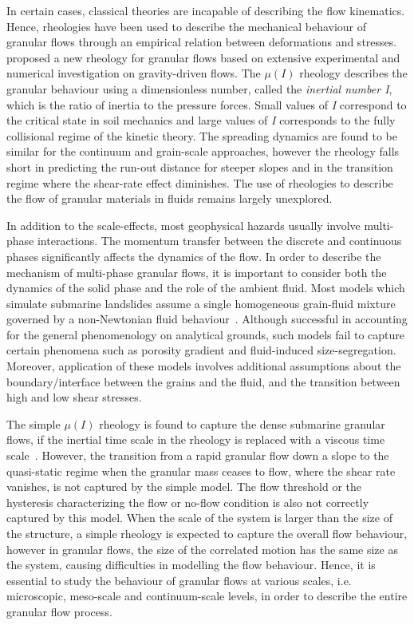In certain cases, classical theories are incapable of describing the flow 
kinematics. Hence, rheologies have been used to describe the mechanical 
behaviour of granular flows through an empirical relation between deformations 
and stresses.~\citet{Midi2004} proposed a new rheology for granular flows based 
on extensive experimental and numerical investigation on gravity-driven flows. 
The $\mu(I)$ rheology describes the granular behaviour using a dimensionless 
number, called the \textit{inertial number I}, which is the ratio of inertia to 
the pressure forces. Small values of \textit{I} correspond to the critical 
state in soil mechanics and large values of \textit{I} corresponds to the fully 
collisional regime of the kinetic theory. The spreading dynamics are found to 
be similar for the continuum and grain-scale approaches, however the rheology 
falls short in predicting the run-out distance for steeper slopes and in the 
transition regime where the shear-rate effect diminishes. The use of rheologies 
to describe the flow of granular materials in fluids remains largely 
unexplored.


In addition to the scale-effects, most geophysical hazards usually involve 
multi-phase interactions. The momentum transfer between the discrete and 
continuous phases significantly affects the dynamics of the flow. In order to 
describe the mechanism of multi-phase granular flows, it is important to 
consider both the dynamics of the solid phase and the role of the ambient 
fluid. Most models which simulate submarine landslides assume a single 
homogeneous grain-fluid mixture governed by a non-Newtonian fluid 
behaviour~\citep{Denlinger2001,Iverson2000}. Although successful in accounting 
for the general phenomenology on analytical grounds, such models fail to 
capture certain phenomena such as porosity gradient and fluid-induced 
size-segregation. Moreover, application of these models involves additional 
assumptions about the boundary/interface between the grains and the fluid, and 
the transition between high and low shear stresses. 

The simple $\mu(\textit{I})$ rheology is found to capture the dense submarine 
granular flows, if the inertial time scale in the rheology is replaced with a 
viscous time scale~\citep{Pouliquen2005}. However, the transition from a rapid 
granular flow down a slope to the quasi-static regime when the granular mass 
ceases to flow, where the shear rate vanishes, is not captured by the simple 
model. The flow threshold or the hysteresis characterizing the flow or no-flow 
condition is also not correctly captured by this model. When the scale of the 
system is larger than the size of the structure, a simple rheology is expected 
to capture the overall flow behaviour, however in granular flows, the size of 
the correlated motion has the same size as the system, causing difficulties 
in modelling the flow behaviour. Hence, it is essential to study the behaviour 
of granular flows at various scales, i.e. microscopic, meso-scale and 
continuum-scale levels, in order to describe the entire granular flow process.


